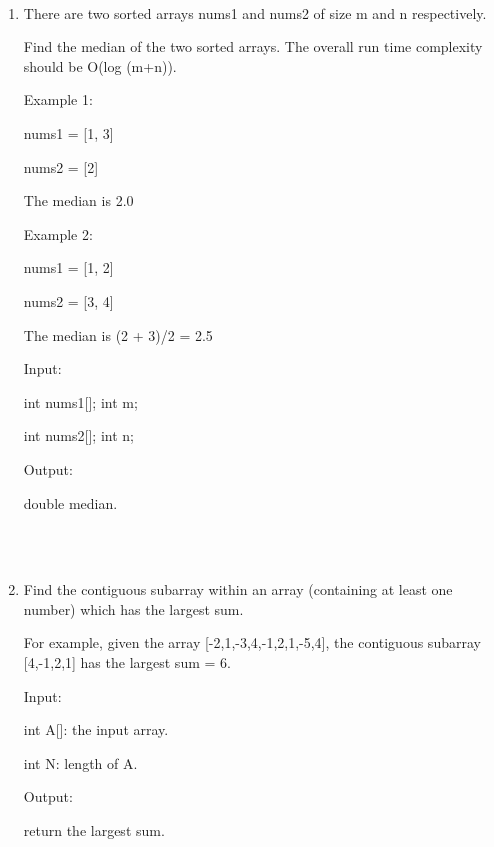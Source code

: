 \documentclass[12pt,a4paper]{article}
\begin{document}
\noindent

\noindent{}
~\\
\begin{enumerate}

\item There are two sorted arrays nums1 and nums2 of size m and n respectively.

Find the median of the two sorted arrays. The overall run time complexity should be O(log (m+n)).

Example 1:

nums1 = [1, 3]

nums2 = [2]

The median is 2.0

Example 2:

nums1 = [1, 2]

nums2 = [3, 4]

The median is (2 + 3)/2 = 2.5

Input:

int nums1[]; int m;

int nums2[]; int n;

Output:

double median.


~\\
~\\


\item Find the contiguous subarray within an array (containing at least one number) which has the largest sum.

For example, given the array [-2,1,-3,4,-1,2,1,-5,4], the contiguous subarray [4,-1,2,1] has the largest sum = 6.

Input:

int A[]: the input array.

int N: length of A.

Output:

return the largest sum.


~\\
~\\



\end{enumerate}
\end{document}
